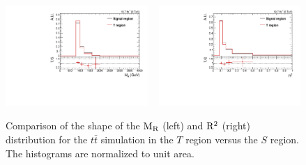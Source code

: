 % 
% 
% 
% 

\begin{figure}[htb]
\centering
\includegraphics[width=0.48\textwidth]{figures/razor_selection/shapeplots/MR_comparison_TTJ_SIG}
~
\includegraphics[width=0.48\textwidth]{figures/razor_selection/shapeplots/R2_comparison_TTJ_SIG}
\caption{Comparison of the shape of the $\mathrm{M_R}$ (left) and $\mathrm{R^2}$ (right) distribution for the
$t\bar{t}$ simulation in the $T$ region versus the $S$ region. The histograms are normalized to
unit area. 
\label{fig:boost_T_region_shape}}
\end{figure}



